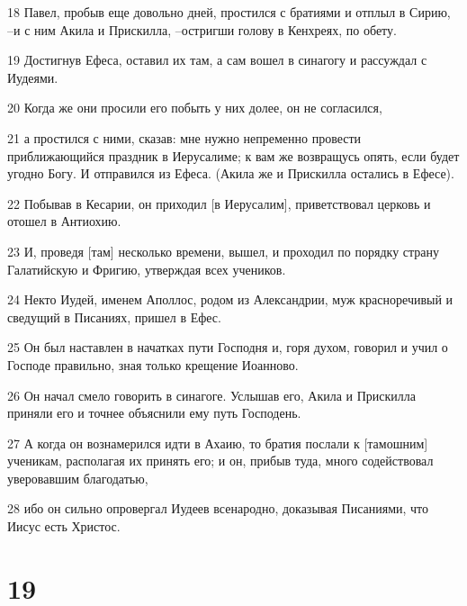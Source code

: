 \par 18 Павел, пробыв еще довольно дней, простился с братиями и отплыл в Сирию, --и с ним Акила и Прискилла, --остригши голову в Кенхреях, по обету.
\par 19 Достигнув Ефеса, оставил их там, а сам вошел в синагогу и рассуждал с Иудеями.
\par 20 Когда же они просили его побыть у них долее, он не согласился,
\par 21 а простился с ними, сказав: мне нужно непременно провести приближающийся праздник в Иерусалиме; к вам же возвращусь опять, если будет угодно Богу. И отправился из Ефеса. (Акила же и Прискилла остались в Ефесе).
\par 22 Побывав в Кесарии, он приходил [в Иерусалим], приветствовал церковь и отошел в Антиохию.
\par 23 И, проведя [там] несколько времени, вышел, и проходил по порядку страну Галатийскую и Фригию, утверждая всех учеников.
\par 24 Некто Иудей, именем Аполлос, родом из Александрии, муж красноречивый и сведущий в Писаниях, пришел в Ефес.
\par 25 Он был наставлен в начатках пути Господня и, горя духом, говорил и учил о Господе правильно, зная только крещение Иоанново.
\par 26 Он начал смело говорить в синагоге. Услышав его, Акила и Прискилла приняли его и точнее объяснили ему путь Господень.
\par 27 А когда он вознамерился идти в Ахаию, то братия послали к [тамошним] ученикам, располагая их принять его; и он, прибыв туда, много содействовал уверовавшим благодатью,
\par 28 ибо он сильно опровергал Иудеев всенародно, доказывая Писаниями, что Иисус есть Христос.

\chapter{19}

